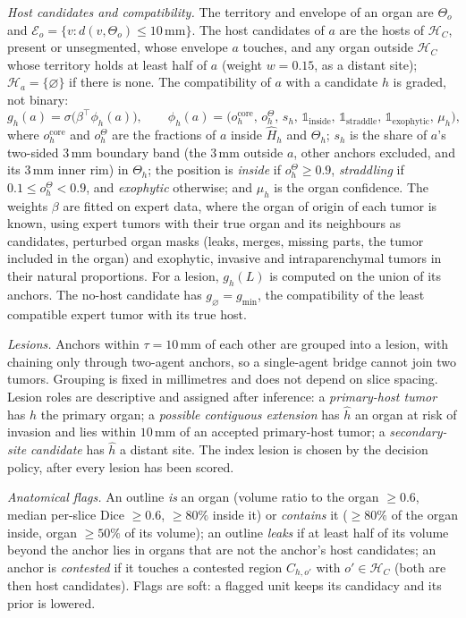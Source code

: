 \documentclass[fleqn,10pt]{olplainarticle}
\begin{document}
\emph{Host candidates and compatibility.} The territory and envelope of an organ are $\Theta_o$ and
$\mathcal{E}_o=\{v:d(v,\Theta_o)\le10\,\mathrm{mm}\}$. The host candidates of $a$ are the hosts of $\mathcal{H}_C$, present
or unsegmented, whose envelope $a$ touches, and any organ outside $\mathcal{H}_C$ whose territory holds at least half of
$a$ (weight $w=0.15$, as a distant site); $\mathcal{H}_a=\{\varnothing\}$ if there is none. The compatibility of $a$ with a
candidate $h$ is graded, not binary:
\begin{equation}
\label{eq:compat}
g_h(a)=\sigma\bigl(\beta^\top\phi_h(a)\bigr),\qquad
\phi_h(a)=\bigl(o^{\mathrm{core}}_h,\,o^{\Theta}_h,\,s_h,\,\mathbb{1}_{\mathrm{inside}},\,\mathbb{1}_{\mathrm{straddle}},\,
\mathbb{1}_{\mathrm{exophytic}},\,\mu_h\bigr),
\end{equation}
where $o^{\mathrm{core}}_h$ and $o^{\Theta}_h$ are the fractions of $a$ inside $\hat H_h$ and $\Theta_h$; $s_h$ is the share
of $a$'s two-sided $3$\,mm boundary band (the $3$\,mm outside $a$, other anchors excluded, and its $3$\,mm inner rim) in
$\Theta_h$; the position is \emph{inside} if $o^{\Theta}_h\ge0.9$, \emph{straddling} if $0.1\le o^{\Theta}_h<0.9$, and
\emph{exophytic} otherwise; and $\mu_h$ is the organ confidence. The weights $\beta$ are fitted on expert data, where the
organ of origin of each tumor is known, using expert tumors with their true organ and its neighbours as candidates,
perturbed organ masks (leaks, merges, missing parts, the tumor included in the organ) and exophytic, invasive and
intraparenchymal tumors in their natural proportions. For a lesion, $g_h(L)$ is computed on the union of its anchors. The
no-host candidate has $g_\varnothing=g_{\min}$, the compatibility of the least compatible expert tumor with its true host.

\emph{Lesions.} Anchors within $\tau=10$\,mm of each other are grouped into a lesion, with chaining only through two-agent
anchors, so a single-agent bridge cannot join two tumors. Grouping is fixed in millimetres and does not depend on slice
spacing. Lesion roles are descriptive and assigned after inference: a \emph{primary-host tumor} has $\hat h$ the primary
organ; a \emph{possible contiguous extension} has $\hat h$ an organ at risk of invasion and lies within $10$\,mm of an
accepted primary-host tumor; a \emph{secondary-site candidate} has $\hat h$ a distant site. The index lesion is chosen by the
decision policy, after every lesion has been scored.

\emph{Anatomical flags.} An outline \emph{is} an organ (volume ratio to the organ $\ge0.6$, median per-slice Dice $\ge0.6$,
$\ge80\%$ inside it) or \emph{contains} it ($\ge80\%$ of the organ inside, organ $\ge50\%$ of its volume); an outline
\emph{leaks} if at least half of its volume beyond the anchor lies in organs that are not the anchor's host candidates;
an anchor is \emph{contested} if it touches a contested region $C_{h,o'}$ with $o'\in\mathcal{H}_C$ (both are then host
candidates). Flags are soft: a flagged unit keeps its candidacy and its prior is lowered.
\end{document}
